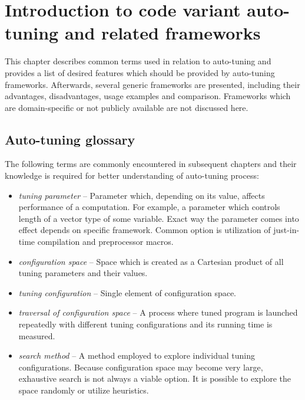 \documentclass
[
    digital, %
    oneside, %
    table, %
    nolof, %
    nolot, %
    nocover %
]{fithesis3}
\begin{document}
\chapter{Introduction to code variant auto-tuning and related frameworks}
This chapter describes common terms used in relation to auto-tuning and provides a list of desired features which should be provided by auto-tuning
frameworks. Afterwards, several generic frameworks are presented, including their advantages, disadvantages, usage examples and comparison. Frameworks
which are domain-specific or not publicly available are not discussed here.

\section{Auto-tuning glossary}
The following terms are commonly encountered in subsequent chapters and their knowledge is required for better understanding of auto-tuning process:
\begin{itemize}
    \item \textit{tuning parameter} -- Parameter which, depending on its value, affects performance of a computation. For example, a parameter which
    controls length of a vector type of some variable. Exact way the parameter comes into effect depends on specific framework. Common option is
    utilization of just-in-time compilation and preprocessor macros.
    \item \textit{configuration space} -- Space which is created as a Cartesian product of all tuning parameters and their values.
    \item \textit{tuning configuration} -- Single element of configuration space.
    \item \textit{traversal of configuration space} -- A process where tuned program is launched repeatedly with different tuning configurations and
    its running time is measured.
    \item \textit{search method} -- A method employed to explore individual tuning configurations. Because configuration space may become very large,
    exhaustive search is not always a viable option. It is possible to explore the space randomly or utilize heuristics.
\end{itemize}
\end{document}
